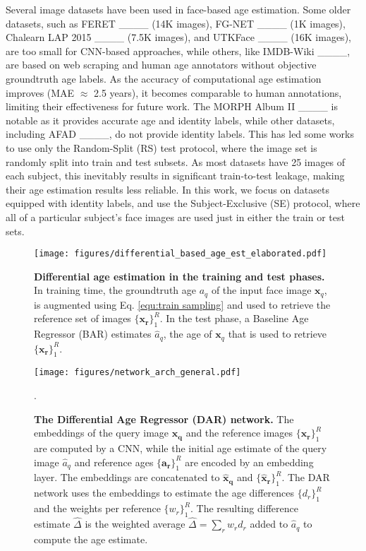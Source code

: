 Several image datasets have been used in face-based age estimation. Some older
datasets, such as FERET ____ (14K images), FG-NET
____ (1K images), Chalearn LAP 2015
____ (7.5K images), and UTKFace ____
(16K images), are too small for CNN-based approaches, while others, like
IMDB-Wiki ____, are based on web scraping and human age annotators
without objective groundtruth age labels. As the accuracy of computational age
estimation improves (MAE $\approx$ 2.5 years), it becomes comparable to human
annotations, limiting their effectiveness for future work. The MORPH Album II
____ is notable as it provides accurate
age and identity labels, while other datasets, including AFAD ____,
do not provide identity labels. This has led some works to use only the
Random-Split (RS) test protocol, where the image set is randomly split into
train and test subsets. As most datasets have 25 images of each subject, this
inevitably results in significant train-to-test leakage, making their age
estimation results less reliable. In this work, we focus on datasets equipped
with identity labels, and use the Subject-Exclusive (SE) protocol, where all
of a particular subject's face images are used just in either the train or
test sets.\begin{figure}[tbh]
\begin{center}
\centering\texttt{[image: figures/differential\_based\_age\_est\_elaborated.pdf]}
\end{center}
\caption{\textbf{Differential age estimation in the training and test phases.}
In training time, the groundtruth age $a_{q}$ of the input face image
$\mathbf{x}_{q}$, is augmented using Eq. \ref{equ:train sampling} and used to
retrieve the reference set of images $\{\boldsymbol{x_{r}}\}_{1}^{R}$. In the
test phase, a Baseline Age Regressor (BAR) estimates $\hat{a}_{q}$, the age of
$\mathbf{x}_{q}$ that is used to retrieve $\{\boldsymbol{x_{r}}\}_{1}^{R}$.}%
\label{fig:differential_based_age_est_elaborated}%
\end{figure}\begin{figure*}[tbh]
\begin{center}
\centering\texttt{[image: figures/network\_arch\_general.pdf]}
\end{center}
\par
.\caption{\textbf{The Differential Age Regressor (DAR) network.} The
embeddings of the query image $\boldsymbol{x_{q}}$ and the reference images
$\{\boldsymbol{x_{r}}\}_{1}^{R}$ are computed by a CNN, while the initial age
estimate of the query image $\hat{a}_{q}$ and reference ages
$\{\boldsymbol{a_{r}}\}_{1}^{R}$ are encoded by an embedding layer. The
embeddings are concatenated to $\boldsymbol{{\hat{x}}_{q}}$ and
$\{\boldsymbol{{\hat{x}}_{r}}\}_{1}^{R}$. The DAR network uses the embeddings
to estimate the age differences $\{{d}_{r}\}_{1}^{R}$ and the weights per
reference $\{{w}_{r}\}_{1}^{R}$. The resulting difference estimate
$\hat{\Delta}$ is the weighted average $\hat{\Delta}=\sum_{r}{w}_{r}{d}_{r}$
added to $\hat{a}_{q}$ to compute the age estimate.}%
\label{fig:network_arch_general}%
\end{figure*}